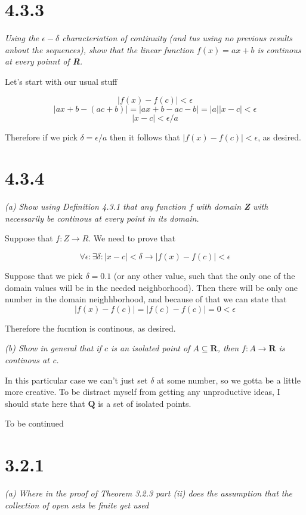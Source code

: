 \documentclass[11pt,oneside,titlepage]{article}
\begin{document}
\section*{4.3.3}
\textit{Using the $\epsilon-\delta$ characteriation of continuity (and tus using no previous results anbout the sequences), show that the linear function $f(x) = ax + b$ is continous at every poinnt of \textbf{R}.}

Let's start with our usual stuff

$$ |f(x) - f(c)| < \epsilon $$
$$ |ax + b - (ac + b)| = |ax + b - ac - b| = |a||x - c| < \epsilon $$
$$|x - c| < \epsilon / a $$

Therefore if we pick $\delta = \epsilon / a$ then it follows that $|f(x) - f(c)| < \epsilon$, as desired.

\section*{4.3.4}
\textit{(a) Show using Definition 4.3.1 that any function $f$ with domain
  \textbf{Z} with necessarily be continous at every point in its domain.}

Suppose that $f: Z \to R$. We need to prove that 

$$\forall \epsilon: \exists \delta: |x - c| < \delta \to |f(x) - f(c)| < \epsilon $$

Suppose that we pick $\delta = 0.1$ (or any other value, such that the only one
of the domain values will be in the needed neighborhood). Then there will be
only one number in the domain neighhborhood, and because of that we can state
that
$$|f(x) - f(c)| = |f(c) - f(c)|  = 0 < \epsilon$$

Therefore the fucntion is continous, as desired.

\textit{(b) Show in general that if $c$ is an isolated point of $A \subseteq \textbf{R}$, then $f: A \to \textbf{R}$ is continous at c.}

In this particular case we can't just set $\delta$ at some number, so we gotta
be a little more creative. To be distract myself from getting any unproductive
ideas, I should state here that $\textbf{Q}$ is a set of isolated points.

To be continued

\section*{3.2.1}
\textit{(a) Where in the proof of Theorem 3.2.3 part (ii) does the assumption
  that the collection of open sets be finite get used}
\end{document}
